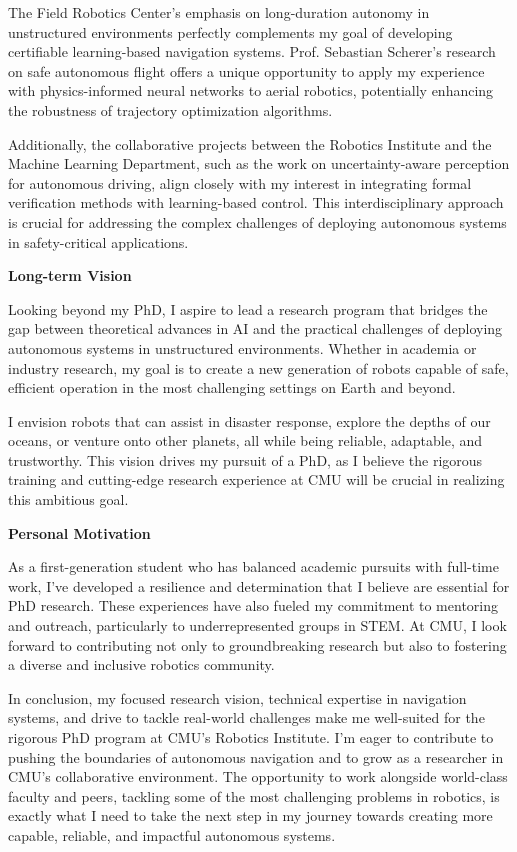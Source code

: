 \documentclass[a4,20pt]{article}
\begin{document}
\begin{large}
The Field Robotics Center's emphasis on long-duration autonomy in unstructured environments perfectly complements my goal of developing certifiable learning-based navigation systems. Prof. Sebastian Scherer's research on safe autonomous flight offers a unique opportunity to apply my experience with physics-informed neural networks to aerial robotics, potentially enhancing the robustness of trajectory optimization algorithms.

Additionally, the collaborative projects between the Robotics Institute and the Machine Learning Department, such as the work on uncertainty-aware perception for autonomous driving, align closely with my interest in integrating formal verification methods with learning-based control. This interdisciplinary approach is crucial for addressing the complex challenges of deploying autonomous systems in safety-critical applications.

\textbf{Long-term Vision}

Looking beyond my PhD, I aspire to lead a research program that bridges the gap between theoretical advances in AI and the practical challenges of deploying autonomous systems in unstructured environments. Whether in academia or industry research, my goal is to create a new generation of robots capable of safe, efficient operation in the most challenging settings on Earth and beyond.

I envision robots that can assist in disaster response, explore the depths of our oceans, or venture onto other planets, all while being reliable, adaptable, and trustworthy. This vision drives my pursuit of a PhD, as I believe the rigorous training and cutting-edge research experience at CMU will be crucial in realizing this ambitious goal.

\textbf{Personal Motivation}

As a first-generation student who has balanced academic pursuits with full-time work, I've developed a resilience and determination that I believe are essential for PhD research. These experiences have also fueled my commitment to mentoring and outreach, particularly to underrepresented groups in STEM. At CMU, I look forward to contributing not only to groundbreaking research but also to fostering a diverse and inclusive robotics community.

In conclusion, my focused research vision, technical expertise in navigation systems, and drive to tackle real-world challenges make me well-suited for the rigorous PhD program at CMU's Robotics Institute. I'm eager to contribute to pushing the boundaries of autonomous navigation and to grow as a researcher in CMU's collaborative environment. The opportunity to work alongside world-class faculty and peers, tackling some of the most challenging problems in robotics, is exactly what I need to take the next step in my journey towards creating more capable, reliable, and impactful autonomous systems.


\end{large}
\end{document}
